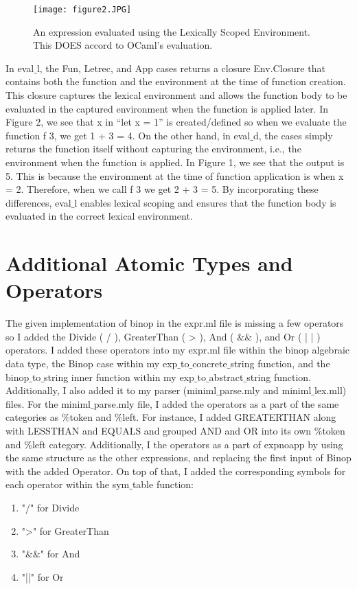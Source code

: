 \documentclass[answers]{exam}
\begin{document}
\begin{figure}[!h]
	\centering
	\texttt{[image: figure2.JPG]}
	\caption{An expression evaluated using the Lexically Scoped Environment. This DOES accord to OCaml’s evaluation.}
	\label{kalman}
\end{figure}

In eval$\_$l, the Fun, Letrec, and App cases returns a closure Env.Closure that contains both the function and the environment at the time of function creation. This closure captures the lexical environment and allows the function body to be evaluated in the captured environment when the function is applied later. In Figure 2, we see that 
x in “let x = 1” is created/defined so when we evaluate the function f 3, we get 1 + 3 = 4. On the other hand, in eval$\_$d, the cases simply returns the function itself without capturing the environment, i.e., the environment when the function is applied. In Figure 1, we see that the output is 5. This is because the environment at the time of function application is when x = 2. Therefore, when we call f 3 we get 2 + 3 = 5. By incorporating these differences, eval$\_$l enables lexical scoping and ensures that the function body is evaluated in the correct lexical environment. 


\section{Additional Atomic Types and Operators}
The given implementation of binop in the expr.ml file is missing a few operators so I added the Divide ( / ), GreaterThan ( > ), And ( $\&\&$ ), and Or ( | | ) operators. I added these operators into my expr.ml file within the binop algebraic data type, the Binop case within my exp$\_$to$\_$concrete$\_$string function, and the binop$\_$to$\_$string inner function within my exp$\_$to$\_$abstract$\_$string function. Additionally, I also added it to my parser (miniml$\_$parse.mly and miniml$\_$lex.mll) files. For the miniml$\_$parse.mly file, I added the operators as a part of the same categories as $\%$token and $\%$left. For instance, I added GREATERTHAN along with LESSTHAN and EQUALS and grouped AND and OR into its own  $\%$token and $\%$left category. Additionally, I the operators as a part of expnoapp by using the same structure as the other expressions, and replacing the first input of Binop with the added Operator. On top of that, I added the corresponding symbols for each operator within the sym$\_$table function:

\begin{enumerate}[(1)]
    \item "/" for Divide
    \item ">" for GreaterThan
    \item "$\&\&$" for And 
    \item "||" for Or
\end{enumerate}
\end{document}

